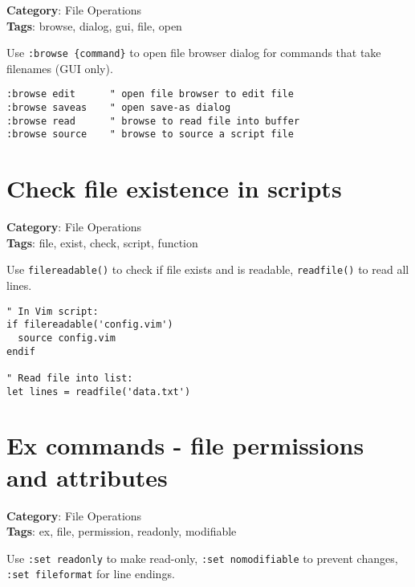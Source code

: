 {{{{{{\textbf{Category}: File Operations\\ \textbf{Tags}: browse, dialog, gui, file, open
\vspace{0.5cm}

Use {\footnotesize \Verb§:browse {command}§} to open file browser dialog for commands that take filenames (GUI only).

\begin{Exa*}{}
\begin{Verbatim}[fontsize=\footnotesize, breaklines, breakanywhere]
:browse edit      " open file browser to edit file
:browse saveas    " open save-as dialog
:browse read      " browse to read file into buffer
:browse source    " browse to source a script file
\end{Verbatim}
\end{Exa*}

\section{Check file existence in scripts}

\textbf{Category}: File Operations\\ \textbf{Tags}: file, exist, check, script, function
\vspace{0.5cm}

Use {\footnotesize \Verb§filereadable()§} to check if file exists and is readable, {\footnotesize \Verb§readfile()§} to read all lines.

\begin{Exa*}{}
\begin{Verbatim}[fontsize=\footnotesize, breaklines, breakanywhere]
" In Vim script:
if filereadable('config.vim')
  source config.vim
endif

" Read file into list:
let lines = readfile('data.txt')
\end{Verbatim}
\end{Exa*}

\section{Ex commands - file permissions and attributes}

\textbf{Category}: File Operations\\ \textbf{Tags}: ex, file, permission, readonly, modifiable
\vspace{0.5cm}

Use {\footnotesize \Verb§:set readonly§} to make read-only, {\footnotesize \Verb§:set nomodifiable§} to prevent changes, {\footnotesize \Verb§:set fileformat§} for line endings.

}}}}}}
